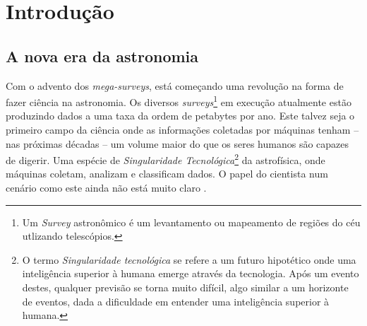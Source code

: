 


\chapter{Introdução}
\label{sec:Intro}


\section{A nova era da astronomia}

Com o advento dos {\em mega-surveys}, está começando uma revolução na forma de
fazer ciência na astronomia. Os diversos {\em surveys}\footnote{Um {\em Survey}
astronômico é um levantamento ou mapeamento de regiões do céu utlizando
telescópios.} em execução atualmente estão produzindo dados a uma taxa da ordem
de petabytes por ano. Este talvez seja o primeiro campo da ciência onde as
informações coletadas por máquinas tenham -- nas próximas décadas -- um volume
maior do que os seres humanos são capazes de digerir. Uma espécie de {\em
Singularidade Tecnológica}\footnote{O termo {\em Singularidade tecnológica} se
refere a um futuro hipotético onde uma inteligência superior à humana emerge
através da tecnologia. Após um evento destes, qualquer previsão se torna muito
difícil, algo similar a um horizonte de eventos, dada a dificuldade em entender
uma inteligência superior à humana.} da astrofísica, onde máquinas coletam,
analizam e classificam dados. O papel do cientista num cenário como este ainda
não está muito claro \citep{Norris2010}.

